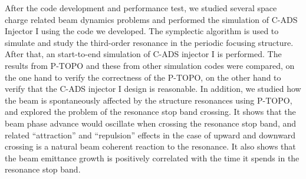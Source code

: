After the code development and performance test, we studied several space charge related beam dynamics problems
and performed the simulation of C-ADS Injector I using the code we developed.
The symplectic algorithm is used to simulate and study the third-order resonance in the periodic focusing structure.
After that, an start-to-end simulation of C-ADS injector I is performed.
The results from P-TOPO and these from other simulation codes were compared,
on the one hand to verify the correctness of the P-TOPO,
on the other hand to verify that the C-ADS injector I design is reasonable.
In addition, we studied how the beam is spontaneously affected by the structure resonances using P-TOPO,
and explored the problem of the resonance stop band crossing.
It shows that the beam phase advance would oscillate when crossing the resonance stop band,
and related ``attraction'' and ``repulsion'' effects in the case of upward
and downward crossing is a natural beam coherent reaction to the resonance.
It also shows that the beam emittance growth is positively correlated with the time it spends in the resonance stop band.



